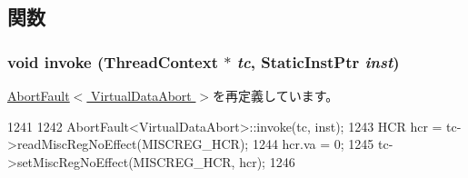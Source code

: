 \subsection{関数}
\hypertarget{classArmISA_1_1VirtualDataAbort_a38260dc6f5fb9598eaf95d8696e3efe8}{
\subsubsection[{invoke}]{\setlength{\rightskip}{0pt plus 5cm}void invoke ({\bf ThreadContext} $\ast$ {\em tc}, \/  {\bf StaticInstPtr} {\em inst})}}
\label{classArmISA_1_1VirtualDataAbort_a38260dc6f5fb9598eaf95d8696e3efe8}


\hyperlink{classArmISA_1_1AbortFault_a2bd783b42262278d41157d428e1f8d6f}{AbortFault$<$ VirtualDataAbort $>$}を再定義しています。


\begin{DoxyCode}
1241 {
1242     AbortFault<VirtualDataAbort>::invoke(tc, inst);
1243     HCR hcr = tc->readMiscRegNoEffect(MISCREG_HCR);
1244     hcr.va = 0;
1245     tc->setMiscRegNoEffect(MISCREG_HCR, hcr);
1246 }
\end{DoxyCode}


